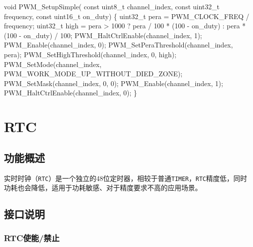 \documentclass[
  12pt,
]{book}
\newenvironment{Shaded}{\begin{snugshade}}{\end{snugshade}}
\newcommand{\DataTypeTok}[1]{\textcolor[rgb]{0.13,0.29,0.53}{#1}}
\newcommand{\DecValTok}[1]{\textcolor[rgb]{0.00,0.00,0.81}{#1}}
\newcommand{\NormalTok}[1]{#1}
\begin{document}
\begin{Shaded}
\begin{Highlighting}[]
\DataTypeTok{void}\NormalTok{ PWM_SetupSimple(}
    \DataTypeTok{const} \DataTypeTok{uint8_t}\NormalTok{ channel_index,}
    \DataTypeTok{const} \DataTypeTok{uint32_t}\NormalTok{ frequency,}
    \DataTypeTok{const} \DataTypeTok{uint16_t}\NormalTok{ on_duty)}
\NormalTok{\{}
    \DataTypeTok{uint32_t}\NormalTok{ pera = PWM_CLOCK_FREQ / frequency;}
    \DataTypeTok{uint32_t}\NormalTok{ high = pera > }\DecValTok{1000}\NormalTok{ ?}
\NormalTok{          pera / }\DecValTok{100}\NormalTok{ * (}\DecValTok{100}\NormalTok{ - on_duty)}
\NormalTok{        : pera * (}\DecValTok{100}\NormalTok{ - on_duty) / }\DecValTok{100}\NormalTok{;}
\NormalTok{    PWM_HaltCtrlEnable(channel_index, }\DecValTok{1}\NormalTok{);}
\NormalTok{    PWM_Enable(channel_index, }\DecValTok{0}\NormalTok{);}
\NormalTok{    PWM_SetPeraThreshold(channel_index, pera);}
\NormalTok{    PWM_SetHighThreshold(channel_index, }\DecValTok{0}\NormalTok{, high);}
\NormalTok{    PWM_SetMode(channel_index, PWM_WORK_MODE_UP_WITHOUT_DIED_ZONE);}
\NormalTok{    PWM_SetMask(channel_index, }\DecValTok{0}\NormalTok{, }\DecValTok{0}\NormalTok{);}
\NormalTok{    PWM_Enable(channel_index, }\DecValTok{1}\NormalTok{);}
\NormalTok{    PWM_HaltCtrlEnable(channel_index, }\DecValTok{0}\NormalTok{);}
\NormalTok{\}}
\end{Highlighting}
\end{Shaded}

\hypertarget{rtc}{%
\chapter{RTC}\label{rtc}}

\hypertarget{ux529fux80fdux6982ux8ff0-2}{%
\section{功能概述}\label{ux529fux80fdux6982ux8ff0-2}}

实时时钟（\texttt{RTC}）是一个独立的48位定时器，相较于普通\texttt{TIMER}，\texttt{RTC}精度低，同时功耗也会降低，适用于功耗敏感、对于精度要求不高的应用场景。

\hypertarget{ux63a5ux53e3ux8bf4ux660e}{%
\section{接口说明}\label{ux63a5ux53e3ux8bf4ux660e}}

\hypertarget{rtcux4f7fux80fdux7981ux6b62}{%
\subsection{RTC使能/禁止}\label{rtcux4f7fux80fdux7981ux6b62}}
\end{document}
